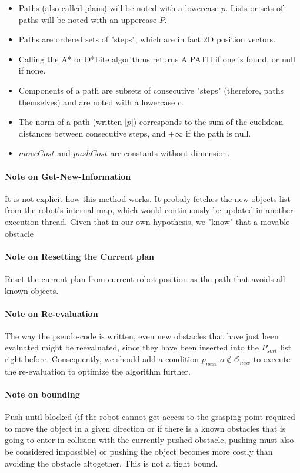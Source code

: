 \begin{itemize}
  \item Paths (also called plans) will be noted with a lowercase $p$. Lists or sets of paths will be noted with an uppercase $P$.
  \item Paths are ordered sets of "steps", which are in fact 2D position vectors.
  \item Calling the A* or D*Lite algorithms returns A PATH if one is found, or null if none.
  \item Components of a path are subsets of consecutive "steps" (therefore, paths themselves) and are noted with a lowercase $c$.
  \item The norm of a path (written $|p|$) corresponds to the sum of the euclidean distances between consecutive steps, and $+\infty$ if the path is null.
  \item $moveCost$ and $pushCost$ are constants without dimension.
\end{itemize}

\paragraph{Note on Get-New-Information}\label{get-new-information_note} It is not explicit how this method works. It probaly fetches the new objects list from the robot's internal map, which would continuously be updated in another execution thread. Given that in our own hypothesis, we "know" that a movable obstacle

\paragraph{Note on Resetting the Current plan}\label{reset_plan_note} Reset the current plan from current robot position as the path that avoids all known objects.

\paragraph{Note on Re-evaluation}\label{re-evaluation_note} The way the pseudo-code is written, even new obstacles that have just been evaluated might be reevaluated, since they have been inserted into the $P_{sort}$ list right before. Consequently, we should add a condition $p_{next}.o \notin \mathcal{O}_{new}$ to execute the re-evaluation to optimize the algorithm further.

\paragraph{Note on bounding}\label{bound_note} Push until blocked (if the robot cannot get access to the grasping point required to move the object in a given direction or if there is a known obstacles that is going to enter in collision with the currently pushed obstacle, pushing must also be considered impossible) or pushing the object becomes more costly than avoiding the obstacle altogether. This is not a tight bound.

